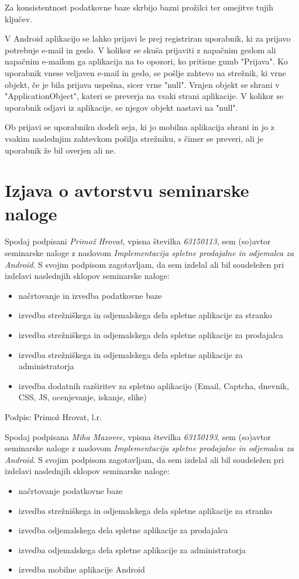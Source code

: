 \documentclass[a4paper,12pt]{report}
\newcommand{\naslov}     {Implementacija spletne prodajalne in odjemalca za Android}
\newcommand{\prviavtor}  {Primož Hrovat}
\newcommand{\prviindeks} {63150113}
\newcommand{\drugiavtor} {Miha Mazovec}
\newcommand{\drugiindeks}{63150193}
\begin{document}
Za konsistentnost podatkovne baze skrbijo bazni prožilci ter omejitve tujih ključev.

V Android aplikacijo se lahko prijavi le prej registriran uporabnik, ki za prijavo potrebuje e-mail in geslo. V kolikor se skuša prijaviti z napačnim geslom ali napačnim e-mailom ga aplikacija na to opozori, ko pritisne gumb "Prijava". Ko uporabnik vnese veljaven e-mail in geslo, se pošlje zahtevo na strežnik, ki vrne objekt, če je bila prijava uspešna, sicer vrne "null". Vrnjen objekt se shrani v "ApplicationObject", kateri se preverja na vsaki strani aplikacije. V kolikor se uporabnik odjavi iz aplikacije, se njegov objekt nastavi na "null". 

Ob prijavi se uporabniku dodeli seja, ki jo mobilna aplikacija shrani in jo z vsakim naslednjim zahtevkom pošilja strežniku, s čimer se preveri, ali je uporabnik že bil overjen ali ne.

\chapter{Izjava o avtorstvu seminarske naloge}

Spodaj podpisani \textit{\prviavtor}, vpisna številka \textit{\prviindeks}, sem (so)avtor seminarske naloge z naslovom \textit{\naslov}. S svojim podpisom zagotavljam, da sem izdelal ali bil soudeležen pri izdelavi naslednjih sklopov seminarske naloge:
\begin{itemize}
    \item načrtovanje in izvedba podatkovne baze
    \item izvedba strežniškega in odjemalskega dela spletne aplikacije za stranko
    \item izvedba strežniškega in odjemalskega dela spletne aplikacije za prodajalca
    \item izvedba strežniškega in odjemalskega dela spletne aplikacije za administratorja
    \item izvedba dodatnih razširitev za spletno aplikacijo (Email, Captcha, dnevnik, CSS, JS, ocenjevanje, iskanje, slike)
\end{itemize}

Podpis: {\prviavtor}, l.r.

\newpage

Spodaj podpisana \textit{\drugiavtor}, vpisna številka \textit{\drugiindeks}, sem (so)avtor seminarske naloge z naslovom \textit{\naslov}. S svojim podpisom zagotavljam, da sem izdelal ali bil soudeležen pri izdelavi naslednjih sklopov seminarske naloge:
\begin{itemize}
    \item načrtovanje podatkovne baze
	 \item izvedba strežniškega in odjemalskega dela spletne aplikacije za stranko
	 \item izvedba odjemalskega dela spletne aplikacije za prodajalca
	 \item izvedba odjemalskega dela spletne aplikacije za administratorja
	 \item izvedba mobilne aplikacije Android
\end{itemize}
\end{document}
